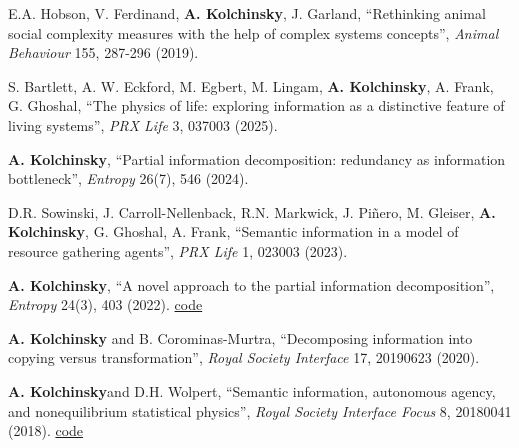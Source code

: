 E.A. Hobson, V. Ferdinand, \textbf{A. Kolchinsky}, J. Garland, ``Rethinking animal social complexity measures with the help of complex systems concepts'', \emph{Animal Behaviour} 155, 287-296 (2019).  



\vspace{15pt}

S. Bartlett, A. W. Eckford, M. Egbert, M. Lingam, \textbf{A. Kolchinsky}\CA, A. Frank\CA, G. Ghoshal\CA, ``The physics of life: exploring information as a distinctive feature of living systems'', \emph{PRX Life} 3, 037003 (2025).    %

\textbf{A. Kolchinsky}, ``Partial information decomposition: redundancy as information bottleneck'', \emph{Entropy} 26(7), 546 (2024).  

D.R. Sowinski, J. Carroll-Nellenback, R.N. Markwick, J. Piñero, M. Gleiser, \textbf{A. Kolchinsky}, G. Ghoshal, A. Frank, ``Semantic information in a model of resource gathering agents'', \emph{PRX Life} 1, 023003 (2023).  

\textbf{A. Kolchinsky}, ``A novel approach to the partial information decomposition'', \emph{Entropy} 24(3), 403 (2022).  \href{https://github.com/artemyk/redundancy}{code}  %

\textbf{A. Kolchinsky} and B. Corominas-Murtra, ``Decomposing information into copying versus transformation'', \emph{Royal Society Interface} 17, 20190623 (2020).   %

\textbf{A. Kolchinsky}\CA and D.H. Wolpert, ``Semantic information, autonomous agency, and nonequilibrium statistical physics'', \emph{Royal Society Interface Focus} 8, 20180041 (2018).  \href{https://github.com/artemyk/semantic_information/}{code}  %


